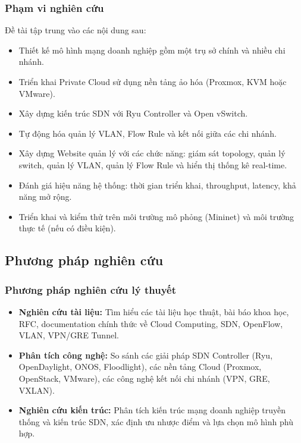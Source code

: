 \subsubsection{Phạm vi nghiên cứu}
Đề tài tập trung vào các nội dung sau:
\begin{itemize}
    \item Thiết kế mô hình mạng doanh nghiệp gồm một trụ sở chính và nhiều chi nhánh.
    \item Triển khai Private Cloud sử dụng nền tảng ảo hóa (Proxmox, KVM hoặc VMware).
    \item Xây dựng kiến trúc SDN với Ryu Controller và Open vSwitch.
    \item Tự động hóa quản lý VLAN, Flow Rule và kết nối giữa các chi nhánh.
    \item Xây dựng Website quản lý với các chức năng: giám sát topology, quản lý switch, quản lý VLAN, quản lý Flow Rule và hiển thị thống kê real-time.
    \item Đánh giá hiệu năng hệ thống: thời gian triển khai, throughput, latency, khả năng mở rộng.
    \item Triển khai và kiểm thử trên môi trường mô phỏng (Mininet) và môi trường thực tế (nếu có điều kiện).
\end{itemize}

\subsection{Phương pháp nghiên cứu}

\subsubsection{Phương pháp nghiên cứu lý thuyết}
\begin{itemize}
    \item \textbf{Nghiên cứu tài liệu:} Tìm hiểu các tài liệu học thuật, bài báo khoa học, RFC, documentation chính thức về Cloud Computing, SDN, OpenFlow, VLAN, VPN/GRE Tunnel.
    \item \textbf{Phân tích công nghệ:} So sánh các giải pháp SDN Controller (Ryu, OpenDaylight, ONOS, Floodlight), các nền tảng Cloud (Proxmox, OpenStack, VMware), các công nghệ kết nối chi nhánh (VPN, GRE, VXLAN).
    \item \textbf{Nghiên cứu kiến trúc:} Phân tích kiến trúc mạng doanh nghiệp truyền thống và kiến trúc SDN, xác định ưu nhược điểm và lựa chọn mô hình phù hợp.
\end{itemize}

